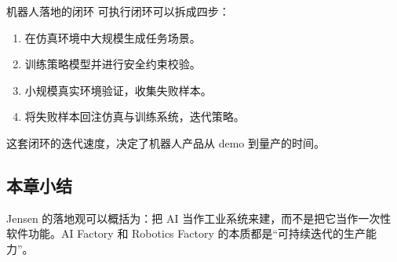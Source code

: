\begin{importantbox}{机器人落地的闭环}
可执行闭环可以拆成四步：
\begin{enumerate}
    \item 在仿真环境中大规模生成任务场景。
    \item 训练策略模型并进行安全约束校验。
    \item 小规模真实环境验证，收集失败样本。
    \item 将失败样本回注仿真与训练系统，迭代策略。
\end{enumerate}
这套闭环的迭代速度，决定了机器人产品从 demo 到量产的时间。
\end{importantbox}

\subsection{本章小结}
Jensen 的落地观可以概括为：把 AI 当作工业系统来建，而不是把它当作一次性软件功能。AI Factory 和 Robotics Factory 的本质都是“可持续迭代的生产能力”。

